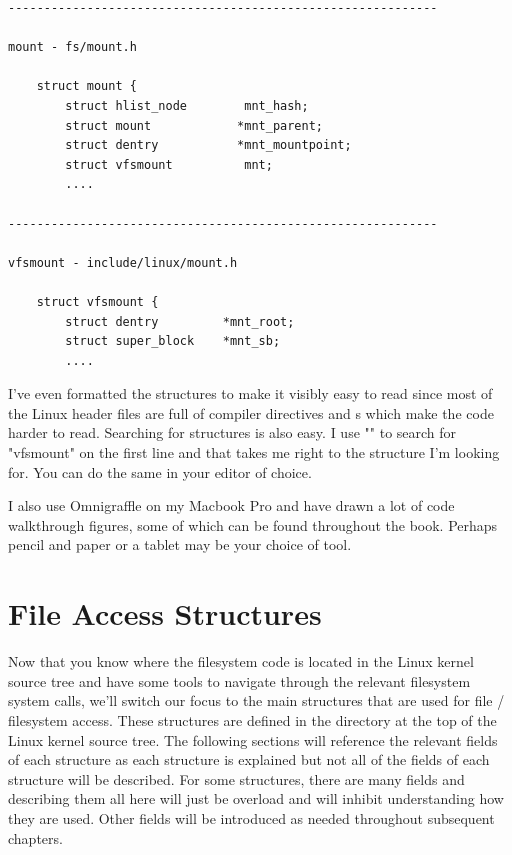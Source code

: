 \begin{lstlisting}
------------------------------------------------------------

mount - fs/mount.h

    struct mount {
        struct hlist_node        mnt_hash;
        struct mount            *mnt_parent;
        struct dentry           *mnt_mountpoint;
        struct vfsmount          mnt;
        ....
    
------------------------------------------------------------

vfsmount - include/linux/mount.h

    struct vfsmount {
        struct dentry         *mnt_root;    
        struct super_block    *mnt_sb;   
        ....
\end{lstlisting}

\noindent
I've even formatted the structures to make it visibly easy to read since most of the Linux header files are full of compiler directives and s which make the code harder to read. Searching for structures is also easy. I use "" to search for "vfsmount" on the first line and that takes me right to the structure I'm looking for. You can do the same in your editor of choice.

I also use Omnigraffle on my Macbook Pro and have drawn a lot of code walkthrough figures, some of which can be found throughout the book. Perhaps pencil and paper or a tablet may be your choice of tool.


\section{File Access Structures}

Now that you know where the filesystem code is located in the Linux kernel source tree and have some tools to navigate through the relevant filesystem system calls, we'll switch our focus to the main structures that are used for file / filesystem access. These structures are defined in the  directory at the top of the Linux kernel source tree. The following sections will reference the relevant fields of each structure as each structure is explained but not all of the fields of each structure will be described. For some structures, there are many fields and describing them all here will just be overload and will inhibit  understanding how they are used. Other fields will be introduced as needed throughout subsequent chapters. 

